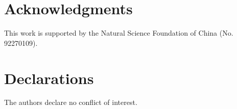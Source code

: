 \documentclass[final,3p,times]{elsarticle}
\begin{document}
\section*{Acknowledgments}
This work is supported by the Natural Science Foundation of China (No. 92270109). %

\section*{Declarations}
The authors declare no conflict of interest.


\end{document}
